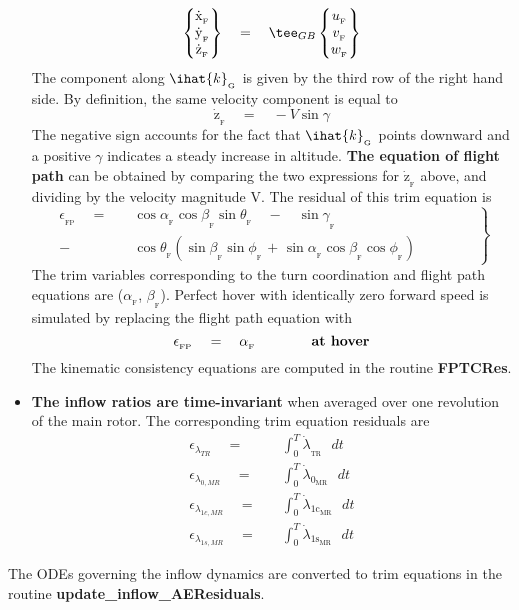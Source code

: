 \begin{itemize}
\begin{equation}
\begin{Bmatrix} \dot{\textrm{x}}_{_\textrm{F}} \\\dot{\textrm{y}}_{_\textrm{F}} \\ \dot{\textrm{z}}_{_\textrm{F}} \end{Bmatrix} \quad = \quad \tee_{GB} \begin{Bmatrix} u_{_\textrm{F}} \\ v_{_\textrm{F}} \\ w_{_\textrm{F}} \end{Bmatrix}
\end{equation}
The component along $\ihat{k}_{_\textrm{G}}$ is given by the third row of the right hand side. By definition, the same velocity component is equal to 
\[ \dot{\textrm{z}}_{_\textrm{F}} \quad = \quad -V \sin \gamma\]
The negative sign accounts for the fact that $\ihat{k}_{_\textrm{G}}$ points downward and a positive $\gamma$ indicates a steady increase in altitude. \textbf{The equation of flight path} can be obtained by comparing the two expressions for $\dot{\textrm{z}}_{_\textrm{F}}$ above, and dividing by the velocity magnitude V. The residual of this trim equation is 
\begin{equation}
\label{eqn:fp}
\left.
\begin{aligned}
\epsilon_{_\textrm{FP}} \quad = \quad & \cos \alpha_{_\textrm{F}} \cos \beta_{_\textrm{F}} \sin \theta_{_\textrm{F}} \quad - \quad \sin \gamma_{_\textrm{F}} \\
- & \cos \theta_{_\textrm{F}}(\sin \beta_{_\textrm{F}} \sin \phi_{_\textrm{F}} \textrm{ + } \sin \alpha_{_\textrm{F}} \cos \beta_{_\textrm{F}} \cos \phi_{_\textrm{F}}) \qquad \qquad
\end{aligned}
\right\}
\end{equation}
The trim variables corresponding to the turn coordination and flight path equations are ($\alpha_{_\textrm{F}}$, $\beta_{_\textrm{F}}$). Perfect hover with identically zero forward speed is simulated by replacing the flight path equation with 
\begin{equation*}
\epsilon_{_\textrm{FP}} \quad = \quad \alpha_{_\textrm{F}} \qquad \qquad \textbf{\textrm{at hover}}
\end{equation*}
The kinematic consistency equations are computed in the routine \textbf{FPTCRes}. 
\item \textbf{The inflow ratios are time-invariant} when averaged over one revolution of the main rotor. The corresponding trim equation residuals are  
\begin{align*}
\epsilon_{\lambda_{TR}} \quad = \quad &\int_0^T \dot{\lambda}_{_\textrm{TR}} \textrm{ }dt \\
\epsilon_{\lambda_{0,MR}} \quad = \quad &\int_0^T \dot{\lambda}_{0_\textrm{MR}} \textrm{ }dt \\
\epsilon_{\lambda_{1c,MR}} \quad = \quad &\int_0^T \dot{\lambda}_{\textrm{1c}_\textrm{MR}} \textrm{ }dt \\
\epsilon_{\lambda_{1s,MR}} \quad = \quad &\int_0^T \dot{\lambda}_{\textrm{1s}_\textrm{MR}} \textrm{ }dt 
\end{align*}
\end{itemize}
The ODEs governing the inflow dynamics are converted to trim equations in the routine \textbf{update\_inflow\_AEResiduals}.
